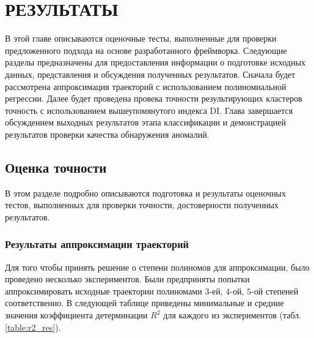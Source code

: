 \chapter{РЕЗУЛЬТАТЫ}
\label{ch:РЕЗУЛЬТАТЫ}

В этой главе описываются оценочные тесты, выполненные для проверки предложенного подхода на основе разработанного фреймворка. Следующие разделы предназначены для предоставления информации о подготовке исходных данных, представления и обсуждения полученных результатов. Сначала будет рассмотрена аппроксимация траекторий с использованием полиномиальной регрессии. Далее будет проведена провека точности результирующих кластеров точность с использованием вышеупомянутого индекса DI. Глава завершается обсуждением выходных результатов этапа классификации и демонстрацией результатов проверки качества обнаружения аномалий.

\section{Оценка точности}

В этом разделе подробно описываются подготовка и результаты оценочных тестов, выполненных для проверки точности, достоверности полученных результатов.

\subsection{Результаты аппроксимации траекторий}

Для того чтобы принять решение о степени полиномов для аппроксимации, было проведено несколько экспериментов. Были предприняты попытки аппроксимировать исходные траектории полиномами $3$-ей, $4$-ой, $5$-ой степеней соответственно. В следующей таблице приведены минимальные и средние значения коэффициента детерминации $R^2$ для каждого из экспериментов (табл. \ref{table:r2_res}).

